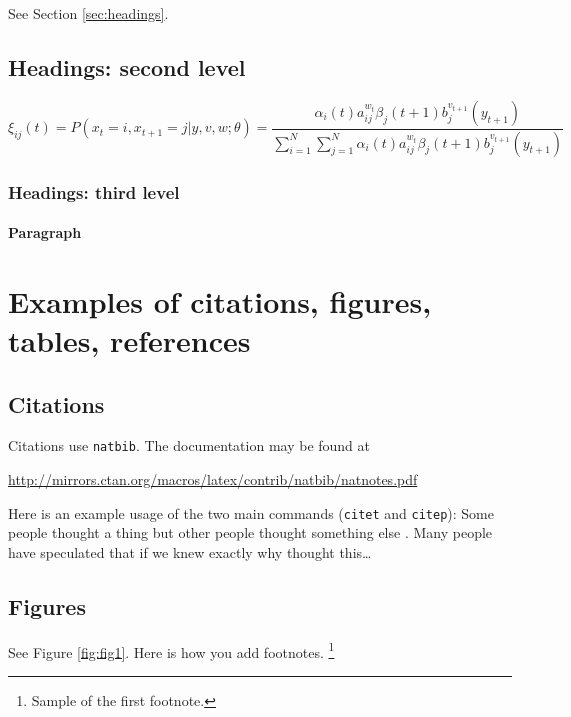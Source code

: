 \documentclass{article}
\begin{document}
\label{sec:headings}



\lipsum[4] See Section \ref{sec:headings}.

\subsection{Headings: second level}
\lipsum[5]
\begin{equation}
	\xi _{ij}(t)=P(x_{t}=i,x_{t+1}=j|y,v,w;\theta)= {\frac {\alpha _{i}(t)a^{w_t}_{ij}\beta _{j}(t+1)b^{v_{t+1}}_{j}(y_{t+1})}{\sum _{i=1}^{N} \sum _{j=1}^{N} \alpha _{i}(t)a^{w_t}_{ij}\beta _{j}(t+1)b^{v_{t+1}}_{j}(y_{t+1})}}
\end{equation}

\subsubsection{Headings: third level}
\lipsum[6]

\paragraph{Paragraph}
\lipsum[7]



\section{Examples of citations, figures, tables, references}
\label{sec:others}

\subsection{Citations}
Citations use \verb+natbib+. The documentation may be found at
\begin{center}
	\url{http://mirrors.ctan.org/macros/latex/contrib/natbib/natnotes.pdf}
\end{center}

Here is an example usage of the two main commands (\verb+citet+ and \verb+citep+): Some people thought a thing \citep{kour2014real, hadash2018estimate} but other people thought something else \citep{kour2014fast}. Many people have speculated that if we knew exactly why \citet{kour2014fast} thought this\dots

\subsection{Figures}
\lipsum[10]
See Figure \ref{fig:fig1}. Here is how you add footnotes. \footnote{Sample of the first footnote.}
\lipsum[11]
\end{document}
